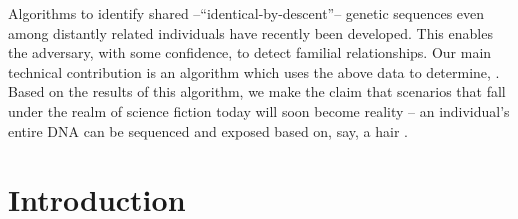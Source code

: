 \documentclass[conference,compsoc]{IEEEtran}
\begin{document}
Algorithms to identify shared --``identical-by-descent''-- genetic sequences even among distantly related individuals have recently been developed. This enables the adversary, with some confidence, to detect familial relationships. Our main technical contribution is an algorithm which uses the above data to determine, . Based on the results of this algorithm, we make the claim that scenarios that fall under the realm of science fiction today will soon become reality -- an individual's entire DNA can be sequenced and exposed based on, say, a hair .

\section{Introduction}
\label{intro}
\end{document}
